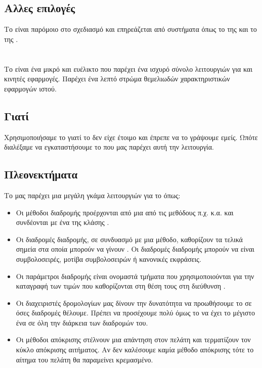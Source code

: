 \subsection*{Αλλες επιλογές}
\pSpace Το  είναι παρόμοιο στο σχεδιασμό και επηρεάζεται από συστήματα όπως το  της  και το  της .

\section{}
\pSpace Το  είναι ένα μικρό και ευέλικτο  που παρέχει ένα ισχυρό σύνολο λειτουργιών για  και κινητές εφαρμογές. Παρέχει ένα λεπτό στρώμα θεμελιωδών χαρακτηριστικών εφαρμογών ιστού.

\subsection*{Γιατί}
\pSpace Χρησιμοποιήσαμε το  γιατί το  δεν είχε έτοιμο  και έπρεπε να το γράψουμε εμείς. Ωπότε διαλέξαμε να εγκαταστήσουμε το  που μας παρέχει αυτή την λειτουργία. 

\subsection*{Πλεονεκτήματα}
\pSpace Το  μας παρέχει μια μεγάλη γκάμα λειτουργιών για το  όπως:
\begin{itemize}
    \item {}
        Οι μέθοδοι διαδρομής προέρχονται από μια από τις μεθόδους  π.χ.  κ.α. και συνδέονται με ένα  της κλάσης .
    \item {}
        Οι διαδρομές διαδρομής, σε συνδυασμό με μια  μέθοδο, καθορίζουν τα τελικά σημεία στα οποία μπορούν να γίνουν . Οι διαδρομές διαδρομής μπορούν να είναι συμβολοσειρές, μοτίβα συμβολοσειρών ή κανονικές εκφράσεις.
    \item {}
        Οι παράμετροι διαδρομής είναι ονομαστά τμήματα  που χρησιμοποιούνται για την καταγραφή των τιμών που καθορίζονται στη θέση τους στη διεύθυνση .
    \item {}
        Οι διαχειριστές δρομολογίων μας δίνουν την δυνατότητα να προωθήσουμε το  σε όσες διαδρομές θέλουμε. Πρέπει να προσέχουμε πολύ όμως το  να έχει το μέγιστο ένα  σε όλη την διάρκεια των διαδρομών του.
    \item {}
        Οι μέθοδοι απόκρισης στέλνουν μια απάντηση στον πελάτη και τερματίζουν τον κύκλο απόκρισης αιτήματος. Αν δεν καλέσουμε καμία μέθοδο απόκρισης τότε το αίτημα του πελάτη θα παραμείνει κρεμασμένο.
\end{itemize}
 
